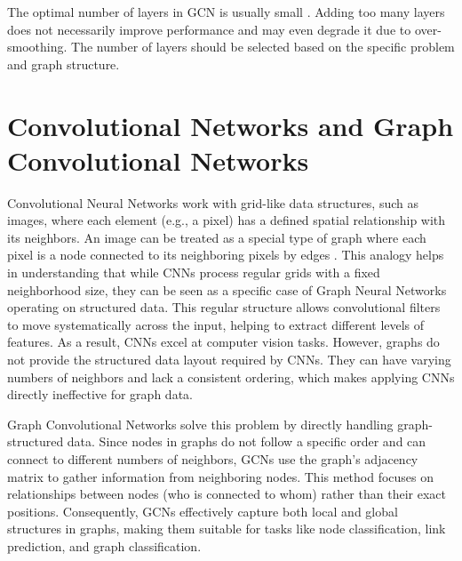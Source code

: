 The optimal number of layers in GCN is usually small \cite{optimal_no_of_layers}\cite{kipf2017}. Adding too many layers does not necessarily improve performance and may even degrade it due to over-smoothing. The number of layers should be selected based on the specific problem and graph structure.

\section{Convolutional Networks and Graph Convolutional Networks}
Convolutional Neural Networks work with grid-like data structures, such as images, where each element (e.g., a pixel) has a defined spatial relationship with its neighbors. An image can be treated as a special type of graph where each pixel is a node connected to its neighboring pixels by edges \cite{sanch2021}\cite{Lesk2024}. This analogy helps in understanding that while CNNs process regular grids with a fixed neighborhood size, they can be seen as a specific case of Graph Neural Networks operating on structured data. This regular structure allows convolutional filters to move systematically across the input, helping to extract different levels of features. As a result, CNNs excel at computer vision tasks. However, graphs do not provide the structured data layout required by CNNs. They can have varying numbers of neighbors and lack a consistent ordering, which makes applying CNNs directly ineffective for graph data.

Graph Convolutional Networks solve this problem by directly handling graph-structured data. Since nodes in graphs do not follow a specific order and can connect to different numbers of neighbors, GCNs use the graph's adjacency matrix to gather information from neighboring nodes. This method focuses on relationships between nodes (who is connected to whom) rather than their exact positions. Consequently, GCNs effectively capture both local and global structures in graphs, making them suitable for tasks like node classification, link prediction, and graph classification.


